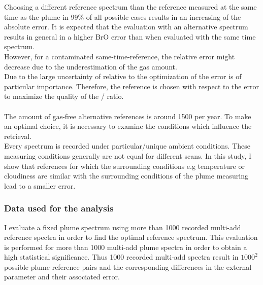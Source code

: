 %
Choosing a different reference spectrum than the reference measured at the same time as the plume in 99\% of all possible cases results in an increasing of the absolute error. 
It is expected that the evaluation with an alternative spectrum results in general in a higher BrO error than when evaluated with the same time spectrum.\\
However, for a contaminated same-time-reference, the relative error might decrease due to the underestimation of the gas amount. \\
Due to the large uncertainty of  relative to  the optimization of the  error is of particular importance. Therefore, the reference is chosen with respect to the  error to maximize the quality of the / ratio. \\
\\
The amount of gas-free alternative references is around 1500 per year. To make an optimal choice, it is necessary to examine the conditions which influence the  retrieval.\\
Every spectrum is recorded under particular/unique ambient conditions. These measuring conditions generally are not equal for different scans. In this study, I show that references for which the surrounding conditions e.g temperature or cloudiness are similar with the surrounding conditions of the  plume measuring lead to a smaller error.\\
%
\subsubsection*{Data used for the analysis}
I evaluate a fixed plume spectrum using more than 1000 recorded multi-add reference spectra in order to find the optimal reference spectrum. This evaluation is performed for more than 1000 multi-add plume spectra in order to obtain a high statistical significance. Thus 1000 recorded multi-add spectra result in $1000^2$ possible plume reference pairs and the corresponding differences in the external parameter and their associated  error. 


